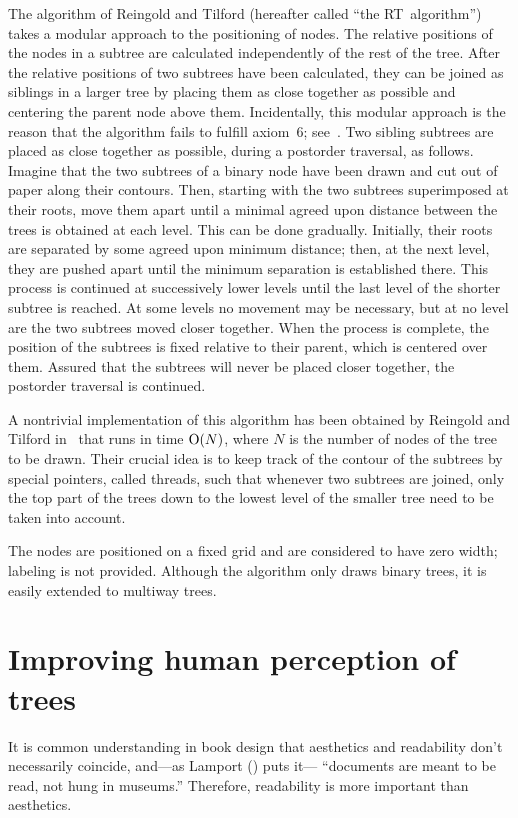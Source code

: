 The algorithm of Reingold and Tilford (hereafter called ``the RT~algorithm'')
takes a modular approach to the
positioning of nodes. The relative positions of the nodes in a subtree
are calculated independently of the rest of the tree. After the
relative positions of two subtrees have been calculated, they can be
joined as siblings in a larger tree by placing them as close
together as possible and centering the parent node above them.
Incidentally, this modular approach is the reason that the
algorithm fails to fulfill axiom~6; see~\cite{Complexity}.
Two sibling subtrees are placed as close together as possible,
during a postorder traversal, as follows.
Imagine that the two subtrees of a binary node
have been drawn and cut out of paper along
their contours. Then, starting with the two subtrees superimposed at their
roots, move them apart until a minimal agreed upon distance
between the trees is obtained at each level. This can be done gradually.
Initially, their roots are separated by some agreed upon minimum
distance; then, at the next level, they are pushed
apart until the minimum separation is established there.
This process is continued at successively lower levels until the
last level of the shorter subtree is reached. At some levels no movement may be
necessary, but at no level are the two subtrees moved closer
together. When the process is complete, the position of the
subtrees is fixed relative to their parent, which is centered over them.
Assured that the subtrees will never be placed closer together,
the postorder traversal is continued.

A nontrivial implementation of
this algorithm has been obtained by Reingold and Tilford in~\cite{TidierTrees} 
that runs in time ${\rm O}(N)$, where $N$ is the number of
nodes of the tree to be drawn.
Their crucial idea is to keep track of the contour of the subtrees
by special pointers, called threads, such that whenever
two subtrees are joined, only the
top part of the trees down to the lowest level of the
smaller tree need to be taken into account.

The nodes are positioned on a fixed grid and are
considered to have zero width; labeling is not provided. 
Although the algorithm only draws binary trees, it is easily 
extended to multiway trees.

\section{Improving human perception of trees}

It is common understanding in book design that aesthetics and readability
don't necessarily coincide, and---as Lamport (\cite{LaTeX}) puts it---%
``documents are meant to be read, not hung in museums.'' 
Therefore, readability is more important than aesthetics.

